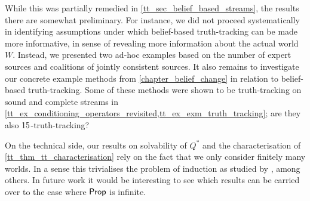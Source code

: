 While this was partially remedied in \cref{tt_sec_belief_based_streams}, the
results there are somewhat preliminary. For instance, we did not proceed
systematically in identifying assumptions under which belief-based
truth-tracking can be made more informative, in sense of revealing more
information about the actual world $W$. Instead, we presented two ad-hoc
examples based on the number of expert sources and coalitions of jointly
consistent sources. It also remains to investigate our concrete example methods
from \cref{chapter_belief_change} in relation to belief-based truth-tracking.
Some of these methods were shown to be truth-tracking on sound and complete
streams in
\cref{tt_ex_conditioning_operators_revisited,tt_ex_exm_truth_tracking}; are
they also $15$-truth-tracking?

On the technical side, our results on solvability of $Q^*$ and the
characterisation of \cref{tt_thm_tt_characterisation} rely on the fact that we
only consider finitely many worlds. In a sense this trivialises the problem of
induction as studied by \textcite{kelly1997reliable,Baltag_2016}, among others. In
future work it would be interesting to see which results can be carried over to
the case where $\mathsf{Prop}$ is infinite.
